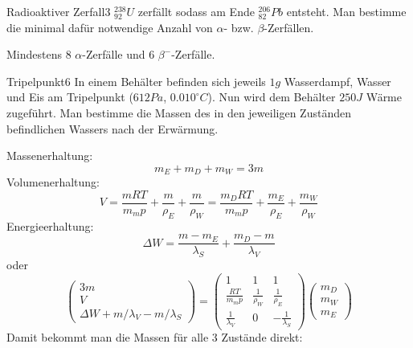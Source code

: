


\begin{problem}{Radioaktiver Zerfall}{3}
$_{92}^{238}U$ zerfällt sodass am Ende $_{82}^{206}Pb$ entsteht. Man bestimme die minimal dafür notwendige Anzahl von $\alpha$- bzw. $\beta$-Zerfällen.
\begin{solution}
Mindestens $8$ $\alpha$-Zerfälle und $6$ $\beta^-$-Zerfälle.
\end{solution}
\end{problem}

\begin{problem}{Tripelpunkt}{6}
In einem Behälter befinden sich jeweils $1 \unit{g}$ Wasserdampf, Wasser und Eis am Tripelpunkt ($612 \unit{Pa}$, $0.010^\circ \unit{C}$). Nun wird dem Behälter $250 \unit{J}$ Wärme zugeführt. Man bestimme die Massen des in den jeweiligen Zuständen befindlichen Wassers nach der Erwärmung.
\begin{solution}
Massenerhaltung:\vspace{-1ex}\[
m_E + m_D + m_W = 3m
\]
Volumenerhaltung:\vspace{-1ex}\[
V=\frac{m RT}{m_m p} + \frac{m}{\rho_E} + \frac{m}{\rho_W} = \frac{m_D RT}{m_m p} + \frac{m_E}{\rho_E} + \frac{m_W}{\rho_W}
\]
Energieerhaltung:\vspace{-1ex}\[
\Delta W = \frac{m-m_E}{\lambda_S} + \frac{m_D-m}{\lambda_V}
\]
oder\vspace{-1ex}\[
\begin{pmatrix}
3m \\ V \\ \Delta W + m / \lambda_V - m / \lambda_S
\end{pmatrix}
=
\begin{pmatrix}
1 & 1 & 1 \\
\frac{RT}{m_m p} & \frac{1}{\rho_W} & \frac{1}{\rho_E} \\
\frac{1}{\lambda_V} & 0 & - \frac{1}{\lambda_S}
\end{pmatrix}
\begin{pmatrix}
m_D \\ m_W \\ m_E
\end{pmatrix}
\]
Damit bekommt man die Massen für alle 3 Zustände direkt:
\[
\begin{split}

\end{split}\]
\end{solution}
\end{problem}
